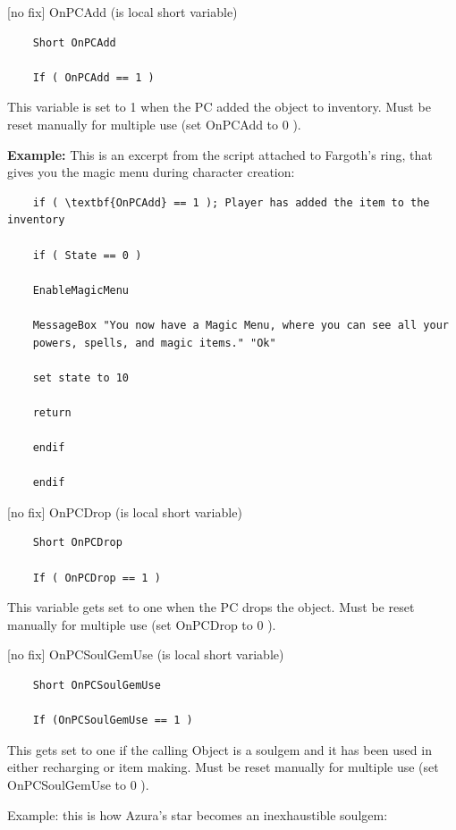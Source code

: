 	{[}no fix{]} OnPCAdd (is local short variable)

\begin{lstlisting}	
	Short OnPCAdd
	
	If ( OnPCAdd == 1 )
\end{lstlisting}

This variable is set to 1 when the PC added the object to inventory.
Must be reset manually for multiple use (set OnPCAdd to 0 ).

\textbf{Example:} This is an excerpt from the script attached to
Fargoth's ring, that gives you the magic menu during character creation:

\begin{lstlisting}
	if ( \textbf{OnPCAdd} == 1 ); Player has added the item to the inventory
	
	if ( State == 0 )
	
	EnableMagicMenu
	
	MessageBox "You now have a Magic Menu, where you can see all your
	powers, spells, and magic items." "Ok"
	
	set state to 10
	
	return
	
	endif
	
	endif
\end{lstlisting}
	
{[}no fix{]} OnPCDrop (is local short variable)

\begin{lstlisting}	
	Short OnPCDrop
	
	If ( OnPCDrop == 1 )
\end{lstlisting}

This variable gets set to one when the PC drops the object. Must be
reset manually for multiple use (set OnPCDrop to 0 ).

{[}no fix{]} OnPCSoulGemUse (is local short variable)

\begin{lstlisting}	
	Short OnPCSoulGemUse
	
	If (OnPCSoulGemUse == 1 )
\end{lstlisting}

This gets set to one if the calling Object is a soulgem and it has been
used in either recharging or item making. Must be reset manually for
multiple use (set OnPCSoulGemUse to 0 ).

Example: this is how Azura's star becomes an inexhaustible soulgem:



